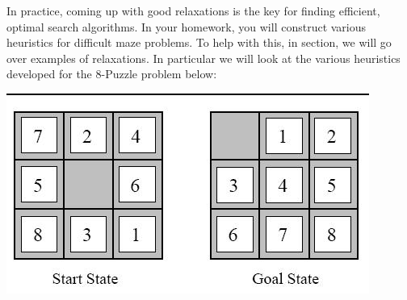 \documentclass[10pt]{article}
\begin{document}
In practice, coming up with good relaxations is the key for finding efficient, optimal search algorithms. In your homework, you will construct various heuristics for difficult maze problems. To help with this, in section, we will go over examples of relaxations. In particular we will look at the various heuristics developed for the 8-Puzzle problem below: 

\begin{center}
  \includegraphics{pics/puzzle}
\end{center}


\end{document}
